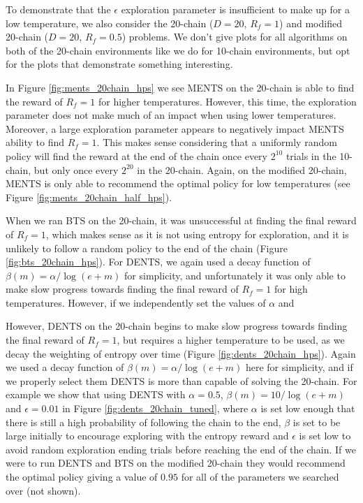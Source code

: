 \documentclass{article}
\theoremstyle{plain}
\begin{document}
\begin{appendices}
            To demonstrate that the $\epsilon$ exploration parameter is insufficient to make up for a low temperature, we also consider the 20-chain ($D=20$, $R_f=1$) and modified 20-chain ($D=20$, $R_f=0.5$) problems. We don't give plots for all algorithms on both of the 20-chain environments like we do for 10-chain environments, but opt for the plots that demonstrate something interesting. 
            
            In Figure \ref{fig:ments_20chain_hps} we see MENTS on the 20-chain is able to find the reward of $R_f=1$ for higher temperatures. However, this time, the exploration parameter does not make much of an impact when using lower temperatures. Moreover, a large exploration parameter appears to negatively impact MENTS ability to find $R_f=1$. This makes sense considering that a uniformly random policy will find the reward at the end of the chain once every $2^{10}$ trials in the 10-chain, but only once every $2^{20}$ in the 20-chain. Again, on the modified 20-chain, MENTS is only able to recommend the optimal policy for low temperatures (see Figure \ref{fig:ments_20chain_half_hps}). 

            When we ran BTS on the 20-chain, it was unsuccessful at finding the final reward of $R_f=1$, which makes sense as it is not using entropy for exploration, and it is unlikely to follow a random policy to the end of the chain (Figure \ref{fig:bts_20chain_hps}). For DENTS, we again used a decay function of $\beta(m)=\alpha/\log(e+m)$ for simplicity, and unfortunately it was only able to make slow progress towards finding the final reward of $R_f=1$ for high temperatures. However, if we independently set the values of $\alpha$ and 
            
            However, DENTS on the 20-chain begins to make slow progress towards finding the final reward of $R_f=1$, but requires a higher temperature to be used, as we decay the weighting of entropy over time (Figure \ref{fig:dents_20chain_hps}). Again we used a decay function of $\beta(m)=\alpha/\log(e+m)$ here for simplicity, and if we properly select them DENTS is more than capable of solving the 20-chain. For example we show that using DENTS with $\alpha=0.5$, $\beta(m)=10/\log(e+m)$ and $\epsilon=0.01$ in Figure \ref{fig:dents_20chain_tuned}, where $\alpha$ is set low enough that there is still a high probability of following the chain to the end, $\beta$ is set to be large initially to encourage exploring with the entropy reward and $\epsilon$ is set low to avoid random exploration ending trials before reaching the end of the chain. If we were to run DENTS and BTS on the modified 20-chain they would recommend the optimal policy giving a value of $0.95$ for all of the parameters we searched over (not shown).
            

\end{appendices}
\end{document}
